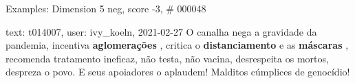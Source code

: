 \begin{frame}{Examples: Dimension 5 neg, score -3, \# 000048}
\footnotesize
\begin{alertblock}{text: t014007, user: ivy\_koeln, 2021-02-27}
O canalha nega a gravidade da pandemia, incentiva \textbf{aglomerações} , 
critica o \textbf{distanciamento} e as \textbf{máscaras} , recomenda tratamento 
ineficaz, não testa, não vacina, desrespeita os mortos, despreza o povo. E seus 
apoiadores o aplaudem! Malditos cúmplices de genocídio! 
\end{alertblock}
\end{frame}
